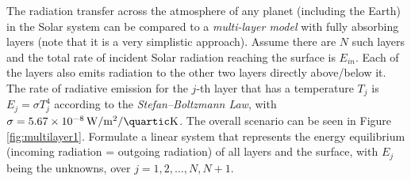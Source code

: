 \begin{exmp}
\label{exmp:multilayer1}
The radiation transfer across the atmosphere of any planet (including the Earth) in the Solar system can be compared to a \textit{multi-layer model} with fully absorbing layers (note that it is a very simplistic approach). Assume there are $N$ such layers and the total rate of incident Solar radiation reaching the surface is $E_{in}$. Each of the layers also emits radiation to the other two layers directly above/below it. The rate of radiative emission for the $j$-th layer that has a temperature $T_j$ is $E_j = \sigma T_j^4$ according to the \textit{Stefan–Boltzmann Law}, with $\sigma = \SI{5.67e-8}{\W \per \square\m \per \quartic\K}$. The overall scenario can be seen in Figure \ref{fig:multilayer1}. Formulate a linear system that represents the energy equilibrium (incoming radiation = outgoing radiation) of all layers and the surface, with $E_j$ being the unknowns, over $j = 1, 2, \ldots, N, N+1$.
\end{exmp}
